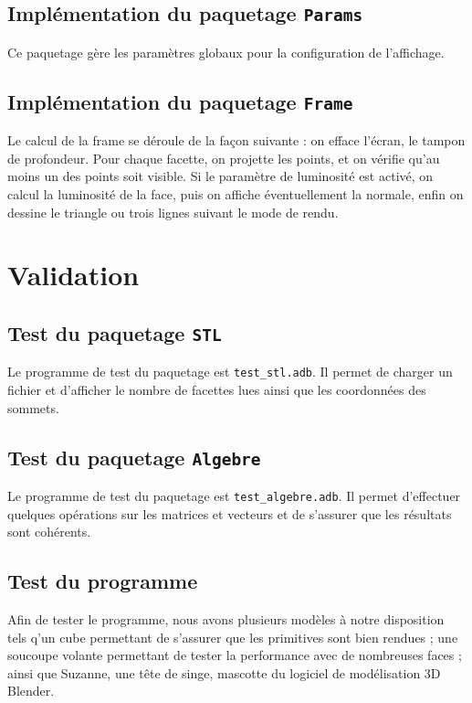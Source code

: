 \documentclass[10pt]{article}
\begin{document}
\subsection{Implémentation du paquetage {\tt Params}}
Ce paquetage gère les paramètres globaux pour la configuration de l'affichage.

\subsection{Implémentation du paquetage {\tt Frame}}
Le calcul de la frame se déroule de la façon suivante : on efface l'écran, le tampon de profondeur. Pour chaque facette, on projette les points, et on vérifie qu'au moins un des points soit visible. Si le paramètre de luminosité est activé, on calcul la luminosité de la face, puis on affiche éventuellement la normale, enfin on dessine le triangle ou trois lignes suivant le mode de rendu.





\section{Validation}

\subsection{Test du paquetage {\tt STL}}

Le programme de test du paquetage est \verb!test_stl.adb!. Il permet de charger un fichier et d'afficher le nombre de facettes lues ainsi que les coordonnées des sommets.

\subsection{Test du paquetage {\tt Algebre}}
Le programme de test du paquetage est \verb!test_algebre.adb!. Il permet d'effectuer quelques opérations sur les matrices et vecteurs et de s'assurer que les résultats sont cohérents.


\subsection{Test du programme}

Afin de tester le programme, nous avons plusieurs modèles à notre disposition tels q'un cube permettant de s'assurer que les primitives sont bien rendues ; une soucoupe volante permettant de tester la performance avec de nombreuses faces ; ainsi que Suzanne, une tête de singe, mascotte du logiciel de modélisation 3D Blender.
\end{document}
